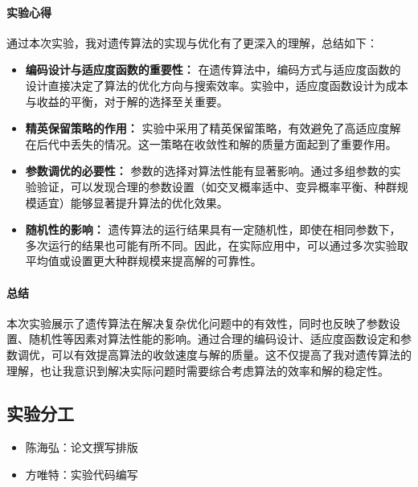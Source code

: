 \documentclass[journal,twoside,web]{ieeecolor}
\begin{document}
\paragraph{实验心得}
通过本次实验，我对遗传算法的实现与优化有了更深入的理解，总结如下：
\begin{itemize}
    \item \textbf{编码设计与适应度函数的重要性：}  
    在遗传算法中，编码方式与适应度函数的设计直接决定了算法的优化方向与搜索效率。实验中，适应度函数设计为成本与收益的平衡，对于解的选择至关重要。
    
    \item \textbf{精英保留策略的作用：}  
    实验中采用了精英保留策略，有效避免了高适应度解在后代中丢失的情况。这一策略在收敛性和解的质量方面起到了重要作用。
    
    \item \textbf{参数调优的必要性：}  
    参数的选择对算法性能有显著影响。通过多组参数的实验验证，可以发现合理的参数设置（如交叉概率适中、变异概率平衡、种群规模适宜）能够显著提升算法的优化效果。
    
    \item \textbf{随机性的影响：}  
    遗传算法的运行结果具有一定随机性，即使在相同参数下，多次运行的结果也可能有所不同。因此，在实际应用中，可以通过多次实验取平均值或设置更大种群规模来提高解的可靠性。
\end{itemize}

\paragraph{总结}
本次实验展示了遗传算法在解决复杂优化问题中的有效性，同时也反映了参数设置、随机性等因素对算法性能的影响。通过合理的编码设计、适应度函数设定和参数调优，可以有效提高算法的收敛速度与解的质量。这不仅提高了我对遗传算法的理解，也让我意识到解决实际问题时需要综合考虑算法的效率和解的稳定性。
\subsection{实验分工}
\begin{itemize}
    \item 陈海弘：论文撰写排版
    \item 方唯特：实验代码编写
\end{itemize}
\end{document}
